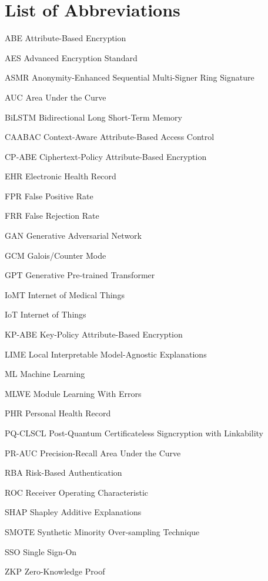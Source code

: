 \documentclass[12pt,a4paper]{report}
\numberwithin{equation}{section}
\newcommand{\acrolabel}[1]{\makebox[3cm][l]{\textbf{#1}}}
\newenvironment{acronyms}{\begin{list}{}{\renewcommand{\makelabel}{\acrolabel}}}{\end{list}}
\begin{document}
    \chapter*{List of Abbreviations}
    \markboth{}{}
    \begin{acronyms}
    \normalsize{
    \item[ABE] Attribute-Based Encryption
    \item[AES] Advanced Encryption Standard
    \item[ASMR] Anonymity-Enhanced Sequential Multi-Signer Ring Signature
    \item[AUC] Area Under the Curve
    \item[BiLSTM] Bidirectional Long Short-Term Memory
    \item[CAABAC] Context-Aware Attribute-Based Access Control
    \item[CP-ABE] Ciphertext-Policy Attribute-Based Encryption
    \item[EHR] Electronic Health Record
    \item[FPR] False Positive Rate
    \item[FRR] False Rejection Rate
    \item[GAN] Generative Adversarial Network
    \item[GCM] Galois/Counter Mode
    \item[GPT] Generative Pre-trained Transformer
    \item[IoMT] Internet of Medical Things
    \item[IoT] Internet of Things
    \item[KP-ABE] Key-Policy Attribute-Based Encryption
    \item[LIME] Local Interpretable Model-Agnostic Explanations
    \item[ML] Machine Learning
    \item[MLWE] Module Learning With Errors
    \item[PHR] Personal Health Record
    \item[PQ-CLSCL] Post-Quantum Certificateless Signcryption with Linkability
    \item[PR-AUC] Precision-Recall Area Under the Curve
    \item[RBA] Risk-Based Authentication
    \item[ROC] Receiver Operating Characteristic
    \item[SHAP] Shapley Additive Explanations
    \item[SMOTE] Synthetic Minority Over-sampling Technique
    \item[SSO] Single Sign-On
    \item[ZKP] Zero-Knowledge Proof
    }
    \end{acronyms}
\end{document}
